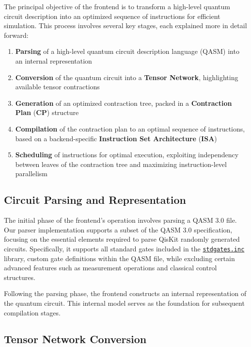 \documentclass[12pt,oneside,a4paper]{article}
\begin{document}
The principal objective of the frontend is to transform a high-level quantum circuit description into an optimized sequence of instructions for efficient simulation. This process involves several key stages, each explained more in detail forward:

\begin{enumerate}
    \item \textbf{Parsing} of a high-level quantum circuit description language (QASM) into an internal representation
    \item \textbf{Conversion} of the quantum circuit into a \textbf{Tensor Network}, highlighting available tensor contractions
    \item \textbf{Generation} of an optimized contraction tree, packed in a \textbf{Contraction Plan} (\textbf{CP}) structure
    \item \textbf{Compilation} of the contraction plan to an optimal sequence of instructions, based on a backend-specific \textbf{Instruction Set Architecture} (\textbf{ISA})
    \item \textbf{Scheduling} of instructions for optimal execution, exploiting independency between leaves of the contraction tree and maximizing instruction-level parallelism
\end{enumerate}

\subsection{Circuit Parsing and Representation}

The initial phase of the frontend's operation involves parsing a QASM 3.0\cite{cross2017openquantumassemblylanguage} file. Our parser implementation supports a subset of the QASM 3.0 specification, focusing on the essential elements required to parse QisKit\cite{qiskit2024} randomly generated circuits. Specifically, it supports all standard gates included in the \href{https://github.com/Qiskit/qiskit/blob/main/qiskit/qasm/libs/stdgates.inc}{\texttt{stdgates.inc}} library, custom gate definitions within the QASM file, while excluding certain advanced features such as measurement operations and classical control structures.

Following the parsing phase, the frontend constructs an internal representation of the quantum circuit. This internal model serves as the foundation for subsequent compilation stages.

\subsection{Tensor Network Conversion}
\end{document}
